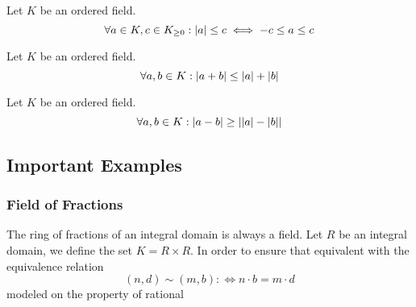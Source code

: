 \begin{proposition}
   Let \(K\) be an ordered field.
   \[\forall a \in K, c \in K_{\geq 0}: \left\lvert a\right\rvert \leq c \iff -c \leq a \leq c\]
\end{proposition}

\begin{proposition}
   Let \(K\) be an ordered field.
   \[\forall a,b \in K: \left\lvert a + b\right\rvert \leq \left\lvert a\right\rvert + \left\lvert b\right\rvert\]
\end{proposition}

\begin{proposition}
   Let \(K\) be an ordered field.
   \[\forall a,b \in K: \left\lvert a - b\right\rvert \geq \left\lvert\left\lvert a\right\rvert- \left\lvert b\right\rvert\right\rvert\]
\end{proposition}

\subsection{Important Examples}
\subsubsection{Field of Fractions}
The ring of fractions of an integral domain is always a field.
Let \(R\) be an integral domain, we define the set \(K = R \times R\).
In order to ensure that equivalent
with the equivalence relation
\[(n, d) \sim (m, b) :\iff n \cdot b = m \cdot d\]
modeled on the property of rational


